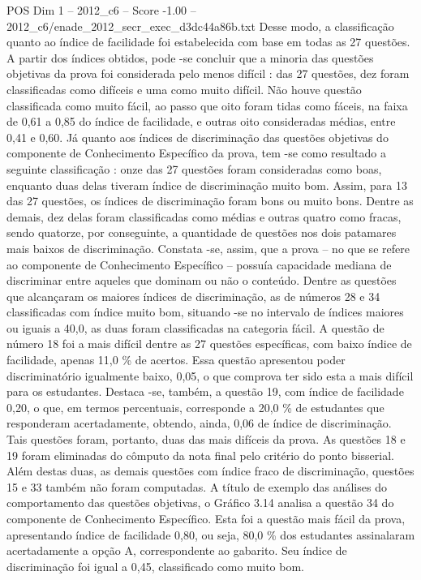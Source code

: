 \begin{textsample}{POS Dim 1 – 2012\_c6 – Score -1.00 – 2012\_c6/enade\_2012\_secr\_exec\_d3dc44a86b.txt}
Desse modo, a classificação quanto ao índice de facilidade foi estabelecida com base em todas as 27 questões.
A partir dos índices obtidos, pode -se concluir que a minoria das questões objetivas da prova foi considerada pelo menos difícil : das 27 questões, dez foram classificadas como difíceis e uma como muito difícil.
Não houve questão classificada como muito fácil, ao passo que oito foram tidas como fáceis, na faixa de 0,61 a 0,85 do índice de facilidade, e outras oito consideradas médias, entre 0,41 e 0,60.
Já quanto aos índices de discriminação das questões objetivas do componente de Conhecimento Específico da prova, tem -se como resultado a seguinte classificação : onze das 27 questões foram consideradas como boas, enquanto duas delas tiveram índice de discriminação muito bom.
Assim, para 13 das 27 questões, os índices de discriminação foram bons ou muito bons.
Dentre as demais, dez delas foram classificadas como médias e outras quatro como fracas, sendo quatorze, por conseguinte, a quantidade de questões nos dois patamares mais baixos de discriminação.
Constata -se, assim, que a prova – no que se refere ao componente de Conhecimento Específico – possuía capacidade mediana de discriminar entre aqueles que dominam ou não o conteúdo.
Dentre as questões que alcançaram os maiores índices de discriminação, as de números 28 e 34 classificadas com índice muito bom, situando -se no intervalo de índices maiores ou iguais a 40,0, as duas foram classificadas na categoria fácil.
A questão de número 18 foi a mais difícil dentre as 27 questões específicas, com baixo índice de facilidade, apenas 11,0 \% de acertos.
Essa questão apresentou poder discriminatório igualmente baixo, 0,05, o que comprova ter sido esta a mais difícil para os estudantes.
Destaca -se, também, a questão 19, com índice de facilidade 0,20, o que, em termos percentuais, corresponde a 20,0 \% de estudantes que responderam acertadamente, obtendo, ainda, 0,06 de índice de discriminação.
Tais questões foram, portanto, duas das mais difíceis da prova.
As questões 18 e 19 foram eliminadas do cômputo da nota final pelo critério do ponto bisserial.
Além destas duas, as demais questões com índice fraco de discriminação, questões 15 e 33 também não foram computadas.
A título de exemplo das análises do comportamento das questões objetivas, o Gráfico 3.14 analisa a questão 34 do componente de Conhecimento Específico.
Esta foi a questão mais fácil da prova, apresentando índice de facilidade 0,80, ou seja, 80,0 \% dos estudantes assinalaram acertadamente a opção A, correspondente ao gabarito.
Seu índice de discriminação foi igual a 0,45, classificado como muito bom.

\end{textsample}
